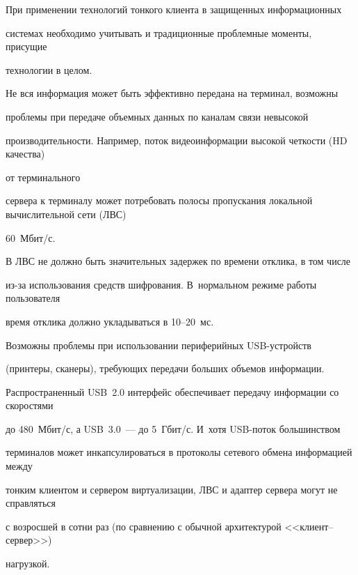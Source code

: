        


     





       При применении технологий тонкого клиента в защищенных информационных 


системах необходимо учитывать и традиционные проблемные моменты, присущие 


технологии в целом.


       


       Не вся информация может быть эффективно передана на терминал, возможны 


проблемы при передаче объемных данных по каналам связи невысокой 


производительности. Например, поток видеоинформации высокой четкости (HD качества)


от терминального 


сервера к терминалу может потребовать полосы пропускания локальной вычислительной сети (ЛВС)


60~Мбит/с. 


       


       В ЛВС не должно быть значительных задержек по времени отклика, в том числе 


из-за использования средств шифрования. В~нормальном режиме работы пользователя 


время отклика должно укладываться в 10--20~мс. 


       


       Возможны проблемы при использовании периферийных USB-устройств 


(принтеры, сканеры), требующих передачи больших объемов информации. 


Распространенный USB~2.0 интерфейс обеспечивает передачу информации со скоростями 


до 480~Мбит/с, а USB~3.0~--- до 5~Гбит/с. И~хотя USB-по\-ток большинством 


терминалов может инкапсулироваться в протоколы сетевого обмена информацией между 


тонким клиентом и сервером виртуализации, ЛВС и адаптер сервера могут не справляться 


с возросшей в сотни раз (по сравнению с обычной архитектурой <<кли\-ент--сер\-вер>>) 


нагрузкой.


